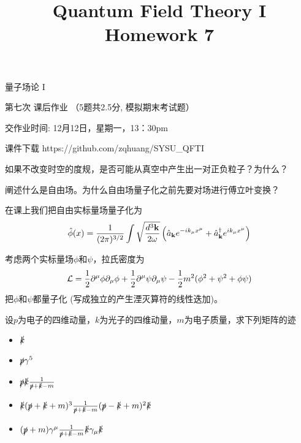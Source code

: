 \documentclass[CJK]{beamer}
\title{Quantum Field Theory I \\ Homework 7}
\author{}
\date{}
\begin{document}
\begin{frame}
 
\begin{center}
\begin{Large}
\bch
量子场论 I 

{\vskip 0.3in}

第七次 课后作业 （5题共2.5分, 模拟期末考试题）

交作业时间: 12月12日，星期一，13：30pm

\ech
\end{Large}
\end{center}

\vskip 0.2in

\bch
课件下载
\ech
https://github.com/zqhuang/SYSU\_QFTI

\end{frame}


\begin{frame}
\bch
如果不改变时空的度规，是否可能从真空中产生出一对正负粒子？为什么？
\ech
\end{frame}

\begin{frame}
\bch
阐述什么是自由场。为什么自由场量子化之前先要对场进行傅立叶变换？
\ech
\end{frame}

\begin{frame}
\bch
在课上我们把自由实标量场量子化为
$$ {\hat{\phi}}(x) = \frac{1}{(2\pi)^{3/2}} \int \sqrt{\frac{d^3{\mathbf{k}}}{2\omega}} \left({\hat{a}}_{{\mathbf{k}}} e^{-ik_\mu x^\mu} + {\hat{a}^\dagger}_{{\mathbf{k}}}e^{ik_\mu x^\mu}\right) $$

考虑两个实标量场$\phi$和$\psi$，拉氏密度为
$${\mathcal{L}} = \frac{1}{2}\partial^\mu\phi\partial_\mu\phi + \frac{1}{2}\partial^\mu\psi\partial_\mu\psi - \frac{1}{2}m^2(\phi^2+\psi^2+\phi\psi) $$
把$\phi$和$\psi$都量子化 (写成独立的产生湮灭算符的线性迭加)。
\ech
\end{frame}


\begin{frame}
\bch
设$p$为电子的四维动量，$k$为光子的四维动量，$m$为电子质量，求下列矩阵的迹
\begin{itemize}
\item{$\slashed{k}$}
\item{$\slashed{p}\gamma^5$}
\item{$\slashed{p}\slashed{k}\frac{1}{\slashed{p}+\slashed{k}-m}$}
\item{$\slashed{k}(\slashed{p}+\slashed{k}+m)^3\frac{1}{\slashed{p}+\slashed{k}-m}(\slashed{p}-\slashed{k}+m)^2\slashed{k}$}
\item{$(\slashed{p}+m)\gamma^\mu\frac{1}{\slashed{p}+\slashed{k} -m}\slashed{k}\gamma_\mu\slashed{k}$}
\end{itemize}
\ech
\end{frame}
\end{document}
